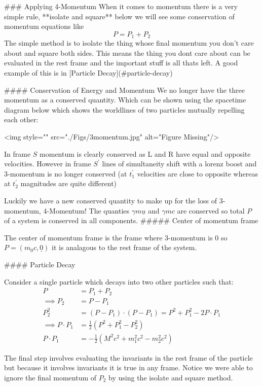 ### Applying 4-Momentum
When it comes to momentum there is a very simple rule, **isolate and square** below we will see some conservation of momentum equations like
$$
 P = P_1 + P_2
$$
The simple method is to isolate the thing whose final momentum you don't care about and square both sides. This means the thing you dont care about can be evaluated in the rest frame and the important stuff is all thats left. A good example of this is in [Particle Decay](#particle-decay)

#### Conservation of Energy and Momentum
We no longer have the three momentum as a conserved quantity. Which can be shown using the spacetime diagram below which shows the worldlines of two particles mutually repelling each other:

<img style="" src="./Figs/3momentum.jpg" alt="Figure Missing"/>

In frame $S$ momentum is clearly conserved as L and R have equal and opposite velocities. However in frame $S^\prime$ lines of simultaneity shift with a lorenz boost and 3-momentum is no longer conserved (at $t^\prime_1$ velocities are close to opposite whereas at $t^\prime_2$ magnitudes are quite different)

Luckily we have a new conserved quantity to make up for the loss of 3-momentum, 4-Momentum! The quanties $\gamma m\underline{u}$ and $\gamma mc$ are conserved so total $P$ of a system is conserved in all components.
##### Center of momentum frame

The center of momentum frame is the frame where 3-momentum is 0 so $P = (m_0c, \underline{0})$ it is analagous to the rest frame of the system.

#### Particle Decay

Consider a single particle which decays into two other particles such that:
$$
\begin{aligned}
P &= P_1 + P_2\\
\implies P_2 &= P - P_1\\
P_2^2 &= (P - P_1)\cdot(P-P_1) = P^2 + P_1^2 - 2P\cdot P_1\\
\implies P\cdot P_1 &= \frac{1}{2}(P^2 + P_1^2 - P_2    ^2)\\
P\cdot P_1 &= -\frac{1}{2}(M^2c^2 + m_1^2c^2 - m_2^2c^2)
\end{aligned}
$$

The final step involves evaluating the invariants in the rest frame of the particle but because it involves invariants it is true in any frame. Notice we were able to ignore the final momentum of $P_2$ by using the isolate and square method.

